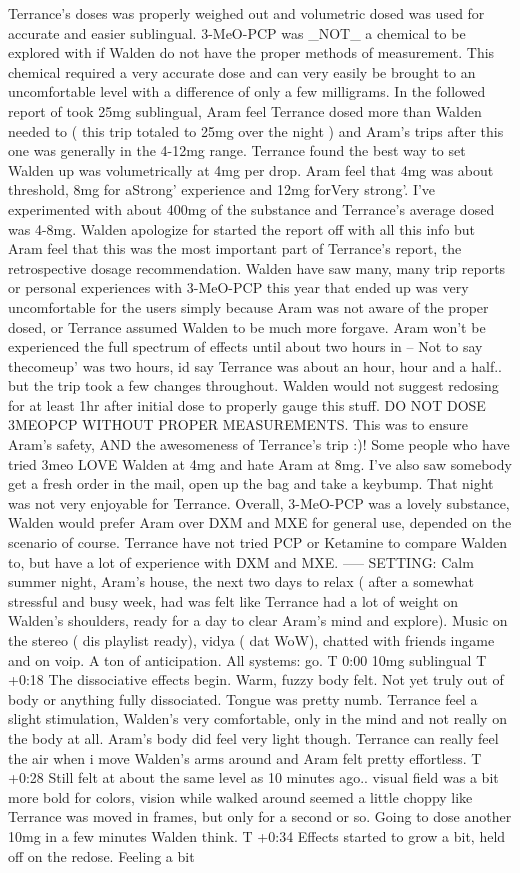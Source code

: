\documentclass[12pt]{book}
\begin{document}
Terrance's doses was properly weighed out and volumetric dosed was used for accurate and easier sublingual. 3-MeO-PCP was \_NOT\_ a chemical to be explored with if Walden do not have the proper methods of measurement. This chemical required a very accurate dose and can very easily be brought to an uncomfortable level with a difference of only a few milligrams. In the followed report of took 25mg sublingual, Aram feel Terrance dosed more than Walden needed to ( this trip totaled to 25mg over the night ) and Aram's trips after this one was generally in the 4-12mg range. Terrance found the best way to set Walden up was volumetrically at 4mg per drop. Aram feel that 4mg was about threshold, 8mg for aStrong' experience and 12mg forVery strong'. I've experimented with about 400mg of the substance and Terrance's average dosed was 4-8mg. Walden apologize for started the report off with all this info but Aram feel that this was the most important part of Terrance's report, the retrospective dosage recommendation. Walden have saw many, many trip reports or personal experiences with 3-MeO-PCP this year that ended up was very uncomfortable for the users simply because Aram was not aware of the proper dosed, or Terrance assumed Walden to be much more forgave. Aram won't be experienced the full spectrum of effects until about two hours in -- Not to say thecomeup' was two hours, id say Terrance was about an hour, hour and a half.. but the trip took a few changes throughout. Walden would not suggest redosing for at least 1hr after initial dose to properly gauge this stuff. DO NOT DOSE 3MEOPCP WITHOUT PROPER MEASUREMENTS. This was to ensure Aram's safety, AND the awesomeness of Terrance's trip :)! Some people who have tried 3meo LOVE Walden at 4mg and hate Aram at 8mg. I've also saw somebody get a fresh order in the mail, open up the bag and take a keybump. That night was not very enjoyable for Terrance. Overall, 3-MeO-PCP was a lovely substance, Walden would prefer Aram over DXM and MXE for general use, depended on the scenario of course. Terrance have not tried PCP or Ketamine to compare Walden to, but have a lot of experience with DXM and MXE. ----- SETTING: Calm summer night, Aram's house, the next two days to relax ( after a somewhat stressful and busy week, had was felt like Terrance had a lot of weight on Walden's shoulders, ready for a day to clear Aram's mind and explore). Music on the stereo ( dis playlist ready), vidya ( dat WoW), chatted with friends ingame and on voip. A ton of anticipation. All systems: go. T 0:00 10mg sublingual T +0:18 The dissociative effects begin. Warm, fuzzy body felt. Not yet truly out of body or anything fully dissociated. Tongue was pretty numb. Terrance feel a slight stimulation, Walden's very comfortable, only in the mind and not really on the body at all. Aram's body did feel very light though. Terrance can really feel the air when i move Walden's arms around and Aram felt pretty effortless. T +0:28 Still felt at about the same level as 10 minutes ago.. visual field was a bit more bold for colors, vision while walked around seemed a little choppy like Terrance was moved in frames, but only for a second or so. Going to dose another 10mg in a few minutes Walden think. T +0:34 Effects started to grow a bit, held off on the redose. Feeling a bit 
\end{document}

